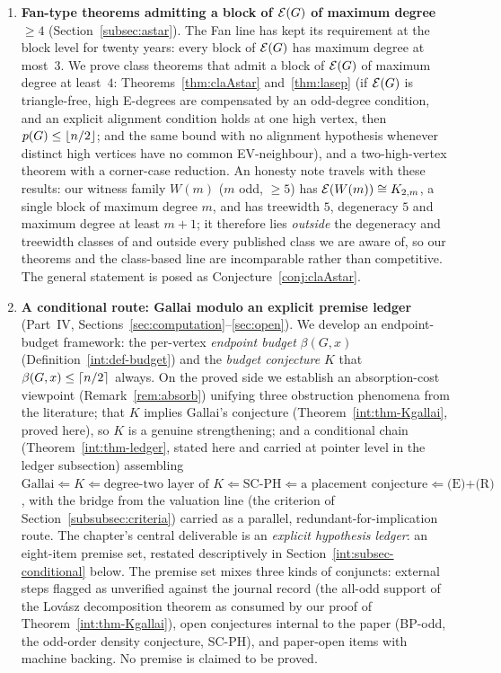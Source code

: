 \begin{enumerate}[label=(\roman*),leftmargin=2em]
\item \textbf{Fan-type theorems admitting a block of $\mathcal{E}(G)$ of maximum degree $\ge4$}
(Section~\ref{subsec:astar}). The Fan line \cite{Fan05,BS21,FHZ23} has kept its requirement at
the block level for twenty years: every block of $\mathcal{E}(G)$ has maximum degree at most~$3$.
We prove class theorems that admit a block of $\mathcal{E}(G)$ of maximum degree at least~$4$:
Theorems~\ref{thm:claAstar} and~\ref{thm:lasep} (if $\mathcal{E}(G)$ is triangle-free, high E-degrees are compensated by an
odd-degree condition, and an explicit alignment condition holds at one high vertex, then
$p(G)\le\left\lfloor n/2 \right\rfloor$; and the same bound with no alignment hypothesis
whenever distinct high vertices have no common EV-neighbour), and a two-high-vertex theorem
with a corner-case reduction. An honesty note travels with these results: our witness
family $W(m)$ ($m$ odd, $\ge5$) has $\mathcal{E}(W(m))\cong K_{2,m}$, a single block of maximum
degree $m$, and has treewidth $5$, degeneracy $5$ and maximum degree at least $m+1$; it
therefore lies \emph{outside} the degeneracy and treewidth classes of \cite{ZLH24,LY24} and
outside every published class we are aware of, so our theorems and the class-based line
\cite{ZLH24,LY24,BCLS20,BP19,CW25} are incomparable rather than competitive. The general
statement is posed as Conjecture~\ref{conj:claAstar}.

\item \textbf{A conditional route: Gallai modulo an explicit premise ledger} (Part~IV,
Sections~\ref{sec:computation}--\ref{sec:open}). We develop an endpoint-budget framework: the
per-vertex \emph{endpoint budget} $\beta(G,x)$ (Definition~\ref{int:def-budget}) and the
\emph{budget conjecture} $K$ that $\beta(G,x)\le\left\lceil n/2 \right\rceil$ always. On the proved side we
establish an absorption-cost viewpoint (Remark~\ref{rem:absorb}) unifying three obstruction
phenomena from the literature; that $K$ implies Gallai's conjecture
(Theorem~\ref{int:thm-Kgallai}, proved here), so $K$ is a genuine strengthening; and a
conditional chain (Theorem~\ref{int:thm-ledger}, stated here and carried at pointer level in
the ledger subsection) assembling
$\text{Gallai}\Leftarrow K\Leftarrow\text{degree-two layer of }K\Leftarrow
\text{SC-PH}\Leftarrow\text{a placement conjecture}\Leftarrow\text{(E)+(R)}$, with the
bridge from the valuation line (the criterion of Section~\ref{subsubsec:criteria}) carried as a
parallel, redundant-for-implication route. The chapter's central deliverable is an \emph{explicit
hypothesis ledger}: an eight-item premise set, restated descriptively in
Section~\ref{int:subsec-conditional} below. The premise set mixes three kinds of conjuncts:
external steps flagged as unverified against the journal record (the all-odd support of the
Lov\'asz decomposition theorem as consumed by our proof of
Theorem~\ref{int:thm-Kgallai}), open conjectures internal to the paper (BP-odd, the
odd-order density conjecture, SC-PH), and paper-open items with machine backing. No premise
is claimed to be proved.


\end{enumerate}
